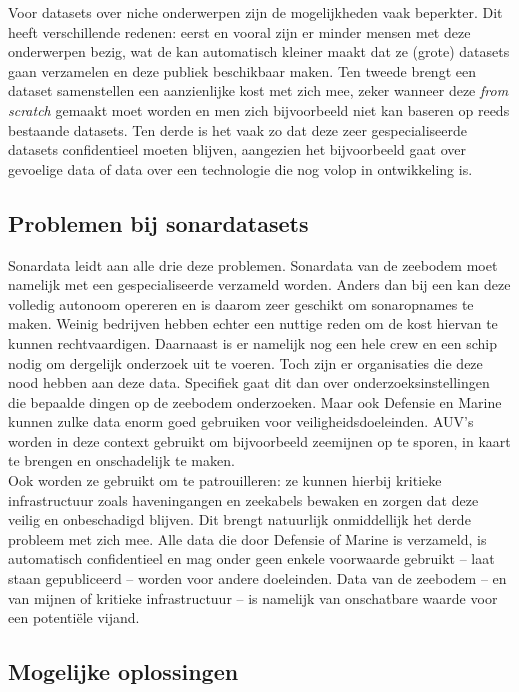 Voor datasets over niche onderwerpen zijn de mogelijkheden vaak beperkter. Dit heeft verschillende redenen: eerst en vooral zijn er minder mensen met deze onderwerpen bezig, wat de kan automatisch kleiner maakt dat ze (grote) datasets gaan verzamelen en deze publiek beschikbaar maken. Ten tweede brengt een dataset samenstellen een aanzienlijke kost met zich mee, zeker wanneer deze \textit{from scratch} gemaakt moet worden en men zich bijvoorbeeld niet kan baseren op reeds bestaande datasets. Ten derde is het vaak zo dat deze zeer gespecialiseerde datasets confidentieel moeten blijven, aangezien het bijvoorbeeld gaat over gevoelige data of data over een technologie die nog volop in ontwikkeling is.

\subsection{Problemen bij sonardatasets}

Sonardata leidt aan alle drie deze problemen. Sonardata van de zeebodem moet namelijk met een gespecialiseerde  verzameld worden. Anders dan bij een  kan deze volledig autonoom opereren en is daarom zeer geschikt om sonaropnames te maken. Weinig bedrijven hebben echter een nuttige reden om de kost hiervan te kunnen rechtvaardigen. Daarnaast is er namelijk nog een hele crew en een schip nodig om dergelijk onderzoek uit te voeren. Toch zijn er organisaties die deze nood hebben aan deze data. Specifiek gaat dit dan over onderzoeksinstellingen die bepaalde dingen op de zeebodem onderzoeken. Maar ook Defensie en Marine kunnen zulke data enorm goed gebruiken voor veiligheidsdoeleinden. AUV's worden in deze context gebruikt om bijvoorbeeld zeemijnen op te sporen, in kaart te brengen en onschadelijk te maken. \\

Ook worden ze gebruikt om te patrouilleren: ze kunnen hierbij kritieke infrastructuur zoals haveningangen en zeekabels bewaken en zorgen dat deze veilig en onbeschadigd blijven. Dit brengt natuurlijk onmiddellijk het derde probleem met zich mee. Alle data die door Defensie of Marine is verzameld, is automatisch confidentieel en mag onder geen enkele voorwaarde gebruikt -- laat staan gepubliceerd -- worden voor andere doeleinden. Data van de zeebodem -- en van mijnen of kritieke infrastructuur -- is namelijk van onschatbare waarde voor een potentiële vijand. \autocite{Aubard_2024_Datasets}

\subsection{Mogelijke oplossingen}

